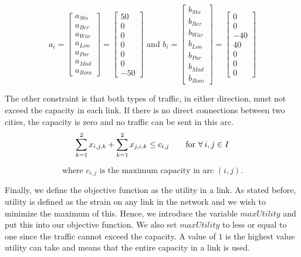  $$a_{i}= 
 \begin{bmatrix}
  a_{Sto}\\
  a_{Ber}\\
  a_{War}\\
  a_{Lon}\\
  a_{Par}\\
  a_{Mad}\\
  a_{Rom}
 \end{bmatrix} =
 \begin{bmatrix}
  50\\
  0\\
  0\\
  0\\
  0\\
  0\\
  -50
 \end{bmatrix}
 \text{ and }
 b_{i}= 
 \begin{bmatrix}
  b_{Sto}\\
  b_{Ber}\\
  b_{War}\\
  b_{Lon}\\
  b_{Par}\\
  b_{Mad}\\
  b_{Rom}
 \end{bmatrix} =
 \begin{bmatrix}
  0\\
  0\\
  -40\\
  40\\
  0\\
  0\\
  0
 \end{bmatrix}$$


The other constraint is that both types of traffic, in either direction, must not exceed the capacity in each link. If there is no direct connections between two cities, the capacity is zero and no traffic can be sent in this arc.
$$\sum\limits_{k =1}^2 x_{i,j,k} + \sum\limits_{k =1}^2 x_{j,i,k} \leq c_{i,j} \qquad \text{for } \forall \: i,j \in I\\$$

$$
\text{where $c_{i,j}$ is the maximum capacity in arc $(i,j)$.}$$

Finally, we define the objective function as the utility in a link. As stated before, utility is defined as the strain on any link in the network and we wish to minimize the maximum of this. Hence, we introduce the variable $maxUtility$ and put this into our objective function. We also set $maxUtility$ to less or equal to one since the traffic cannot exceed the capacity. A value of $1$ is the highest value utility can take and means that the entire capacity in a link is used.

